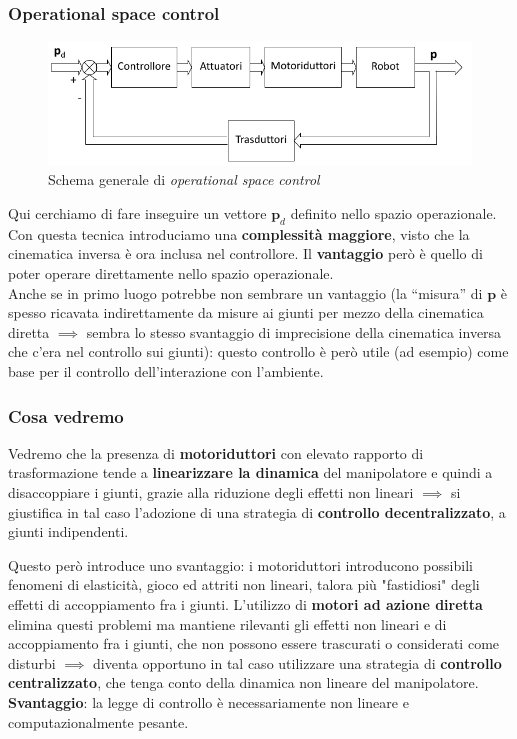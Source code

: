 \subsubsection{Operational space control}
\begin{figure}[ht!]
	\centering
	\includegraphics[width=0.7\linewidth]{images/operational_control_1}
	\caption{Schema generale di \textit{operational space control}}
	\label{fig:operationalcontrol1}
\end{figure}

Qui cerchiamo di fare inseguire un vettore $\mathbf{p}_d$ definito nello spazio operazionale. Con questa tecnica introduciamo una \textbf{complessità maggiore}, visto che la cinematica inversa è ora inclusa nel controllore. Il \textbf{vantaggio} però è quello di poter operare direttamente nello spazio operazionale.\\
Anche se in primo luogo potrebbe non sembrare un vantaggio (la “misura” di $\mathbf{p}$ è spesso ricavata indirettamente da misure ai giunti per mezzo della cinematica diretta $\implies$ sembra lo stesso svantaggio di imprecisione della cinematica inversa che c'era nel controllo sui giunti): questo controllo è però utile (ad esempio) come base per il controllo dell’interazione con l’ambiente.\\

\subsubsection{Cosa vedremo}
Vedremo che la presenza di \textbf{motoriduttori} con elevato rapporto di trasformazione tende a \textbf{linearizzare la dinamica} del manipolatore e quindi a disaccoppiare i giunti, grazie alla riduzione degli effetti non lineari $\implies$ si giustifica in tal caso l’adozione di una strategia di \textbf{controllo decentralizzato}, a giunti indipendenti. 

Questo però introduce uno svantaggio: i motoriduttori introducono possibili fenomeni di elasticità, gioco ed attriti non lineari, talora più "fastidiosi" degli effetti di accoppiamento fra i giunti. L’utilizzo di \textbf{motori ad azione diretta} elimina questi problemi ma mantiene rilevanti gli effetti non lineari e di accoppiamento fra i giunti, che non possono essere trascurati o considerati come disturbi $\implies$ diventa opportuno in tal caso utilizzare una strategia di \textbf{controllo centralizzato}, che tenga conto della dinamica non lineare del manipolatore. \textbf{Svantaggio}: la legge di controllo è necessariamente non lineare e computazionalmente pesante.





